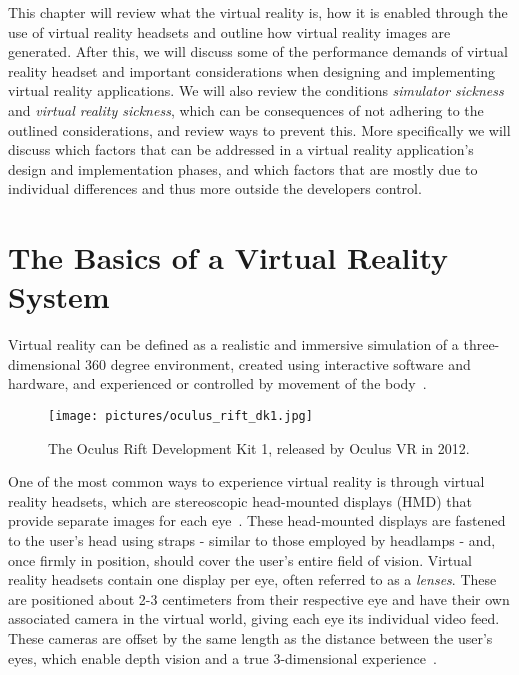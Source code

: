 This chapter will review what the virtual reality is, how it is enabled through the use of virtual reality headsets and 
outline how virtual reality images are generated. After this, we will discuss some of the performance demands of virtual reality headset 
and important considerations when designing and implementing virtual reality applications. 
We will also review the conditions \textit{simulator sickness} and \textit{virtual reality sickness}, which can be consequences of not adhering 
to the outlined considerations, and review ways to prevent this. More specifically we will discuss which factors that can be addressed in a virtual reality application's design and 
implementation phases, and which factors that are mostly due to individual differences and thus more outside the developers control. 


\section{The Basics of a Virtual Reality System}
\label{sec:vr_basics}
Virtual reality can be defined as a realistic and immersive simulation of a three-dimensional 360 degree environment, 
created using interactive software and hardware, and experienced or controlled by movement of the body~\citep{VRS2016}.

\begin{figure}%
	\texttt{[image: pictures/oculus\_rift\_dk1.jpg]}
	\caption[The Oculus Rift Development Kit 1]{The Oculus Rift Development Kit 1, released by Oculus VR in 2012.}
	\label{fig:oculus}
\end{figure}

One of the most common ways to experience virtual reality is through virtual reality headsets, which are stereoscopic head-mounted displays (HMD) 
that provide separate images for each eye~\citep{POLYGON2016}. These head-mounted displays are fastened to the user's head using straps - similar to those employed by 
headlamps - and, once firmly in position, should cover the user's entire field of vision. 
Virtual reality headsets contain one display per eye, often referred to as a \textit{lenses}. These are positioned about 2-3 centimeters from their respective eye and have their own
associated camera in the virtual world, giving each eye its individual video feed. These cameras are offset by the same length as the distance between the user's eyes,
which enable depth vision and a true 3-dimensional experience~\citep{Abrash2012}. 

